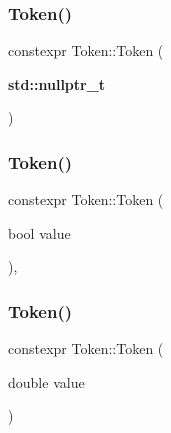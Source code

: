 \mbox{\label{class_token_a8d79a7b0e4e2be8f481096f85c4431f3}} 
\subsubsection{\texorpdfstring{Token()}{Token()}\hspace{0.1cm}{\footnotesize\ttfamily [5/10]}}
{\footnotesize\ttfamily constexpr Token\+::\+Token (\begin{DoxyParamCaption}\item[{\textbf{ std\+::nullptr\+\_\+t}}]{ }\end{DoxyParamCaption})\hspace{0.3cm}{\ttfamily [inline]}}

\mbox{\label{class_token_aa22bec7203c8206f34233f17e41c3187}} 
\subsubsection{\texorpdfstring{Token()}{Token()}\hspace{0.1cm}{\footnotesize\ttfamily [6/10]}}
{\footnotesize\ttfamily constexpr Token\+::\+Token (\begin{DoxyParamCaption}\item[{bool}]{value }\end{DoxyParamCaption})\hspace{0.3cm}{\ttfamily [inline]}, {\ttfamily [explicit]}}

\mbox{\label{class_token_a8a60cd16e3e648204849506898a988c5}} 
\subsubsection{\texorpdfstring{Token()}{Token()}\hspace{0.1cm}{\footnotesize\ttfamily [7/10]}}
{\footnotesize\ttfamily constexpr Token\+::\+Token (\begin{DoxyParamCaption}\item[{double}]{value }\end{DoxyParamCaption})\hspace{0.3cm}{\ttfamily [inline]}}

\mbox{\label{class_token_ad12059c7d3ba95df57a4684c05b6ca97}} 
